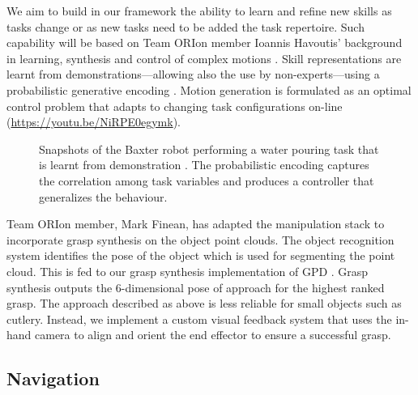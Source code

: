 \documentclass[runningheads,a4paper]{llncs}
\newcommand{\teamori}{Team ORIon}
\begin{document}
We aim to build in our framework the ability
to learn and refine new skills as tasks change or as new tasks need to be added
the task repertoire. Such capability will be based on \teamori{} 
member Ioannis Havoutis' background in learning, synthesis and control of 
complex motions \cite{Havoutis16SSRR}. Skill representations
are learnt from demonstrations---allowing also the use by non-experts---using a probabilistic generative encoding \cite{Havoutis17ICRA}. Motion generation is formulated as an optimal control problem that adapts to changing task configurations on-line \cite{Zeestraten17IROS,Zeestraten2017-RAL} (\url{https://youtu.be/NiRPE0egymk}).
\begin{figure}[!t]
	\centering
	\vspace{-10pt}%
	\caption{Snapshots of the Baxter robot performing a water pouring task that
	is learnt from demonstration \cite{Zeestraten2017-RAL}. The probabilistic
	encoding captures the correlation among task variables and produces a
	controller that generalizes the behaviour.}
	\label{fig:baxter_water_task}
	\vspace{-3ex}
\end{figure}
Team ORIon member, Mark Finean, has adapted the manipulation stack to incorporate grasp synthesis on the object point clouds. The object recognition system identifies the pose of the object which is used for segmenting the point cloud. This is fed to our grasp synthesis implementation of GPD \cite{GPD1} \cite{GPD2}. Grasp synthesis outputs the 6-dimensional pose of approach for the highest ranked grasp. The approach described as above is less reliable for small objects such as cutlery. Instead, we implement a custom visual feedback system that uses the in-hand camera to align and orient the end effector to ensure a successful grasp.  

\subsection{Navigation}
\end{document}
